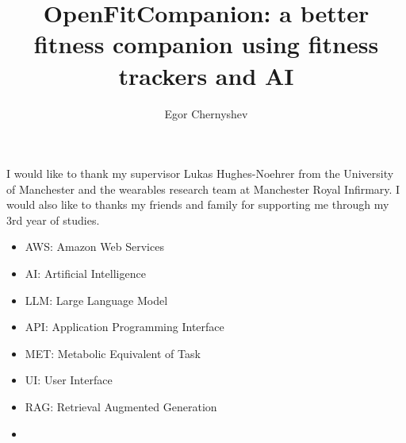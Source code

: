 \documentclass[12pt,BSc,wordcount]{muthesis}
\begin{document}

\title{OpenFitCompanion: a better fitness companion using fitness trackers and AI}
\author{Egor Chernyshev}

\beforeabstract



\afterabstract

I would like to thank my supervisor Lukas Hughes-Noehrer from the University of Manchester and the 
wearables research team at Manchester Royal Infirmary. I would also like to thanks my friends and family
for supporting me through my 3rd year of studies. 

\afterpreface

\begin{itemize}
  \item AWS: Amazon Web Services
  \item AI: Artificial Intelligence
  \item LLM: Large Language Model
  \item API: Application Programming Interface
  \item MET: Metabolic Equivalent of Task
  \item UI: User Interface
  \item RAG: Retrieval Augmented Generation
  \item 
\end{itemize}










\end{document}
